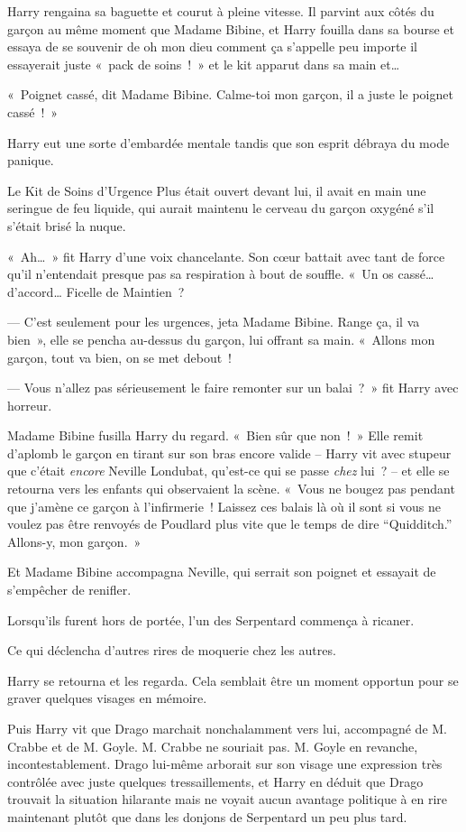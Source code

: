 Harry rengaina sa baguette et courut à pleine vitesse.
Il parvint aux côtés du garçon au même moment que Madame Bibine, et Harry fouilla dans sa bourse et essaya de se souvenir de oh mon dieu comment ça s'appelle peu importe il essayerait juste «~pack de soins~!~» et le kit apparut dans sa main et…

«~Poignet cassé, dit Madame Bibine.
Calme-toi mon garçon, il a juste le poignet cassé~!~»

Harry eut une sorte d'embardée mentale tandis que son esprit débraya du mode panique.

Le Kit de Soins d'Urgence Plus était ouvert devant lui, il avait en main une seringue de feu liquide, qui aurait maintenu le cerveau du garçon oxygéné s'il s'était brisé la nuque.

«~Ah…~» fit Harry d'une voix chancelante.
Son cœur battait avec tant de force qu'il n'entendait presque pas sa respiration à bout de souffle.
«~Un os cassé… d'accord… Ficelle de Maintien~?

--- C'est seulement pour les urgences, jeta Madame Bibine. Range ça, il va bien~», elle se pencha au-dessus du garçon, lui offrant sa main.
«~Allons mon garçon, tout va bien, on se met debout~!

--- Vous n'allez pas sérieusement le faire remonter sur un balai~?~» fit Harry avec horreur.

Madame Bibine fusilla Harry du regard.
«~Bien sûr que non~!~»
Elle remit d'aplomb le garçon en tirant sur son bras encore valide -- Harry vit avec stupeur que c'était \emph{encore} Neville Londubat, qu'est-ce qui se passe \emph{chez} lui~? -- et elle se retourna vers les enfants qui observaient la scène.
«~Vous ne bougez pas pendant que j'amène ce garçon à l'infirmerie~!
Laissez ces balais là où il sont si vous ne voulez pas être renvoyés de Poudlard plus vite que le temps de dire “Quidditch.”
Allons-y, mon garçon.~»

Et Madame Bibine accompagna Neville, qui serrait son poignet et essayait de s'empêcher de renifler.

Lorsqu'ils furent hors de portée, l'un des Serpentard commença à ricaner.

Ce qui déclencha d'autres rires de moquerie chez les autres.

Harry se retourna et les regarda.
Cela semblait être un moment opportun pour se graver quelques visages en mémoire.

Puis Harry vit que Drago marchait nonchalamment vers lui, accompagné de M. Crabbe et de M. Goyle.
M. Crabbe ne souriait pas.
M. Goyle en revanche, incontestablement.
Drago lui-même arborait sur son visage une expression très contrôlée avec juste quelques tressaillements, et Harry en déduit que Drago trouvait la situation hilarante mais ne voyait aucun avantage politique à en rire maintenant plutôt que dans les donjons de Serpentard un peu plus tard.

